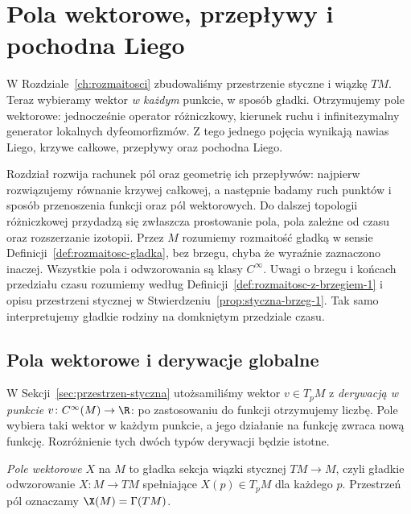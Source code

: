 \chapter{Pola wektorowe, przepływy i pochodna Liego}
\label{ch:pola}

\providecommand{\atlasref}[2]{#2}

W Rozdziale~\ref{ch:rozmaitosci} zbudowaliśmy przestrzenie styczne i wiązkę $TM$.
Teraz wybieramy wektor \emph{w każdym} punkcie, w sposób gładki.
Otrzymujemy pole wektorowe: jednocześnie operator
różniczkowy, kierunek ruchu i infinitezymalny generator lokalnych dyfeomorfizmów.
Z tego jednego pojęcia wynikają nawias Liego, krzywe całkowe, przepływy oraz
pochodna Liego.

Rozdział rozwija rachunek pól oraz geometrię ich przepływów: najpierw
rozwiązujemy równanie krzywej całkowej, a następnie badamy ruch
punktów i sposób przenoszenia funkcji oraz pól wektorowych.
Do dalszej topologii różniczkowej przydadzą się zwłaszcza prostowanie
pola, pola zależne od czasu oraz rozszerzanie izotopii.
Przez $M$ rozumiemy rozmaitość gładką w sensie Definicji~\ref{def:rozmaitosc-gladka},
bez brzegu, chyba że wyraźnie zaznaczono inaczej.
Wszystkie pola i odwzorowania są klasy $C^\infty$.
Uwagi o brzegu i końcach przedziału czasu rozumiemy
według Definicji~\ref{def:rozmaitosc-z-brzegiem-1}
i opisu przestrzeni stycznej w
Stwierdzeniu~\ref{prop:styczna-brzeg-1}.
Tak samo interpretujemy gładkie rodziny na domkniętym przedziale czasu.



\section{Pola wektorowe i derywacje globalne}
\label{sec:derywacje}

W Sekcji~\ref{sec:przestrzen-styczna} utożsamiliśmy wektor $v\in T_pM$ z
\emph{derywacją w punkcie} $v\colon C^\infty(M)\to\R$:
po zastosowaniu do funkcji otrzymujemy liczbę. Pole wybiera taki
wektor w każdym punkcie, a jego działanie na funkcję zwraca nową
funkcję. Rozróżnienie tych dwóch typów derywacji będzie istotne.

\begin{definicja}
\emph{Pole wektorowe} $X$ na $M$ to gładka sekcja wiązki stycznej
$TM\to M$, czyli gładkie odwzorowanie $X\colon M\to TM$ spełniające
$X(p)\in T_pM$ dla każdego $p$. Przestrzeń pól oznaczamy $\X(M)=\Gamma(TM)$.
\end{definicja}

